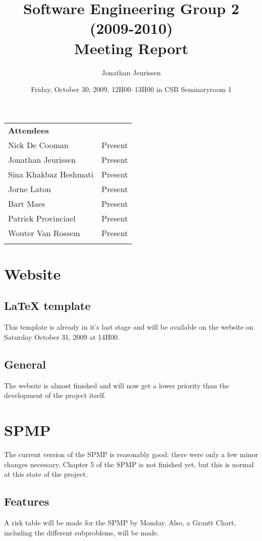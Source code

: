 \documentclass[a4paper, 12pt]{article}
\title{Software Engineering Group 2 (2009-2010) \\Meeting Report}
\author{Jonathan Jeurissen}
\date{ Friday, October 30, 2009, 12H00--13H00 in CSB Seminaryroom 1}
\begin{document}
	\maketitle
	
	\begin{tabular}{l l}
		{\large \textbf{Attendees}} \\
		Nick De Cooman & Present \\
		Jonathan Jeurissen & Present \\
		Sina Khakbaz Heshmati & Present \\
		Jorne Laton & Present \\
		Bart Maes & Present \\
		Patrick Provinciael & Present \\
		Wouter Van Rossem & Present \\
		\\
	\end{tabular}	
	
	
	
	
	\section{Website}
	
	\subsection{\LaTeX{} template}
		This template is already in it's last stage and will be available on the website on Saturday October 31, 2009 at 14H00.
	\subsection{General}
The website is almost finished and will now get a lower priority than the development of the project itself.
	\section{SPMP}
The current version of the SPMP is reasonably good: there were only a few minor changes necessary. Chapter 5 of the SPMP is not finished yet, but this is normal at this state of the project.
	\subsection{Features}
A risk table will be made for the SPMP by Monday. Also, a Grantt Chart, including the different subproblems, will be made.
\end{document}
